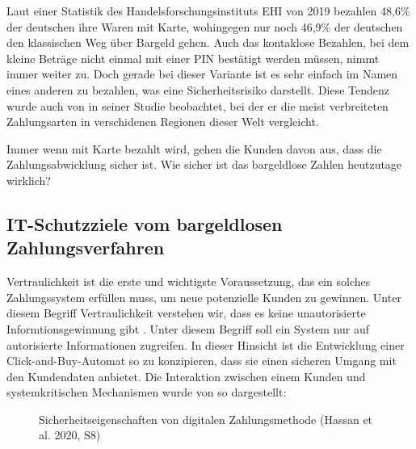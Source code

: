 Laut einer Statistik des Handelsforschungsinstituts EHI von 2019 \cite{refart:KSDL} bezahlen 48,6\% 
der deutschen ihre Waren mit Karte, wohingegen nur noch 46,9\% der deutschen den klassischen 
Weg über Bargeld gehen. Auch das kontaklose Bezahlen, bei dem kleine Beträge nicht einmal mit einer 
PIN bestätigt werden müssen, nimmt immer weiter zu. Doch gerade bei dieser Variante ist es sehr einfach
im Namen eines anderen zu bezahlen, was eine Sicherheitsrisiko darstellt. Diese Tendenz wurde auch
von \cite{refart:TDMP} in seiner Studie beobachtet, bei der er die meist verbreiteten Zahlungsarten
in verschidenen Regionen dieser Welt vergleicht. 


Immer wenn mit Karte bezahlt wird, gehen die Kunden davon aus, dass die Zahlungsabwicklung sicher ist. 
Wie sicher ist das bargeldlose Zahlen heutzutage wirklich? 


\subsection{IT-Schutzziele vom bargeldlosen Zahlungsverfahren}


Vertraulichkeit ist die erste und  wichtigste Voraussetzung, das ein solches Zahlungssystem erfüllen muss, 
um neue potenzielle Kunden zu gewinnen. Unter diesem Begriff Vertraulichkeit verstehen wir, dass es keine 
unautorisierte Informtionsgewinnung gibt \cite{refbook:SWIS}. Unter diesem Begriff soll ein System nur auf
autorisierte Informationen zugreifen. In dieser Hinsicht ist die Entwicklung einer Click-and-Buy-Automat 
so zu konzipieren, dass sie einen sicheren Umgang mit den Kundendaten anbietet. Die Interaktion zwischen
einem Kunden und systemkritischen Mechanismen wurde von \cite{refart:HARE} so dargestellt:

\vfill
\begin{figure}[htb]
    \caption{Sicherheitseigenschaften von digitalen Zahlungsmethode (Hassan et al. 2020, S8)}
    \label{fig:refark_HARE}
\end{figure}
\vfill


